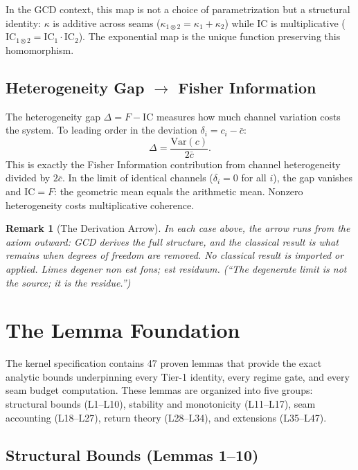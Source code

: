 \documentclass[
  aps,
  prd,
  preprint,
  superscriptaddress,
  nofootinbib,
  floatfix,
  longbibliography
]{revtex4-2}
\newtheorem{remark}{Remark}
\newcommand{\beq}{\begin{equation}}
\newcommand{\eeq}{\end{equation}}
\newcommand{\IC}{\mathrm{IC}}
\newcommand{\Fid}{F}
\newcommand{\Logint}{\kappa}
\newcommand{\hetgap}{\Delta}
\newcommand{\lat}[1]{\textit{#1}}
\begin{document}
In the GCD context, this map is not a choice of
parametrization but a structural identity:
$\Logint$ is additive across seams
($\Logint_{1 \otimes 2} = \Logint_1 + \Logint_2$)
while $\IC$ is multiplicative
($\IC_{1 \otimes 2} = \IC_1 \cdot \IC_2$).
The exponential map is the unique function preserving
this homomorphism.

\subsection{Heterogeneity Gap $\to$ Fisher Information}

The heterogeneity gap $\hetgap = \Fid - \IC$ measures
how much channel variation costs the system.
To leading order in the deviation $\delta_i = c_i - \bar{c}$:
\beq
  \hetgap = \frac{\mathrm{Var}(c)}{2\bar{c}}.
\eeq
This is exactly the Fisher Information contribution
from channel heterogeneity divided by $2\bar{c}$.
In the limit of identical channels ($\delta_i = 0$
for all $i$), the gap vanishes and $\IC = \Fid$:
the geometric mean equals the arithmetic mean.
Nonzero heterogeneity costs multiplicative coherence.

\begin{remark}[The Derivation Arrow]
In each case above, the arrow runs from the axiom
outward: GCD derives the full structure, and the
classical result is what remains when degrees of
freedom are removed.
No classical result is imported or applied.
\lat{Limes degener non est fons; est residuum.}
(``The degenerate limit is not the source; it is
the residue.'')
\end{remark}

\section{The Lemma Foundation}\label{sec:lemmas}

The kernel specification contains 47 proven lemmas that
provide the exact analytic bounds underpinning every
Tier-1 identity, every regime gate, and every seam
budget computation.
These lemmas are organized into five groups:
structural bounds (L1--L10), stability and monotonicity
(L11--L17), seam accounting (L18--L27), return theory
(L28--L34), and extensions (L35--L47).

\subsection{Structural Bounds (Lemmas 1--10)}
\end{document}
